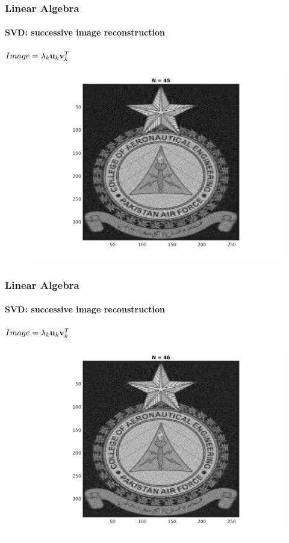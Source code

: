 \documentclass[hyperref={pdfpagelabels=true}]{beamer}
\begin{document}
\begin{frame}
\frametitle{Linear Algebra}
\framesubtitle{SVD: successive image reconstruction} 
\small{
\begin{center}
$Image = \lambda_k{\bf u}_k {\bf v}_k^T$
\end{center}}
\begin{figure}[!htb]
\centering
\includegraphics [scale=0.48]{n/b45.png}
\end{figure}
\end{frame}

\begin{frame}
\frametitle{Linear Algebra}
\framesubtitle{SVD: successive image reconstruction} 
\small{
\begin{center}
$Image = \lambda_k{\bf u}_k {\bf v}_k^T$
\end{center}}
\begin{figure}[!htb]
\centering
\includegraphics [scale=0.48]{n/b46.png}
\end{figure}
\end{frame}
\end{document}
